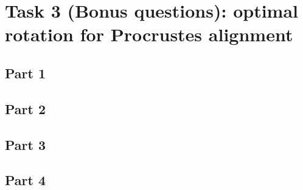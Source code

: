 \section{Task 3 (Bonus questions): optimal rotation for Procrustes alignment}

\subsection{Part 1}
\subsection{Part 2}
\subsection{Part 3}
\subsection{Part 4}